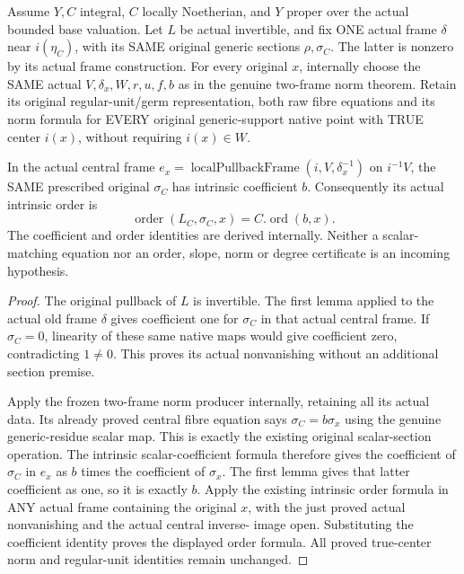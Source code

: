\begin{theorem}
\label{thm:intrinsic-numerical-central-section-original-order-and-norm}
\leanok
{}
Assume $Y,C$ integral, $C$ locally Noetherian, and $Y$ proper over the
actual bounded base valuation. Let $L$ be actual invertible, and fix ONE
actual frame $\delta$ near $i(\eta_C)$, with its SAME original generic
sections $\rho,\sigma_C$. The latter is nonzero by its actual frame
construction. For every original $x$, internally choose the SAME actual
$V,\delta_x,W,r,u,f,b$ as in the genuine two-frame norm theorem. Retain
its original regular-unit/germ representation, both raw fibre equations
and its norm formula for EVERY original generic-support native point with
TRUE center $i(x)$, without requiring $i(x)\in W$.

In the actual central frame
$e_x=\operatorname{localPullbackFrame}(i,V,\delta_x^{-1})$ on $i^{-1}V$,
the SAME prescribed original $\sigma_C$ has intrinsic coefficient $b$.
Consequently its actual intrinsic order is
\[
 \operatorname{order}(L_C,\sigma_C,x)=C.\operatorname{ord}(b,x).
\]
The coefficient and order identities are derived internally. Neither a
scalar-matching equation nor an order, slope, norm or degree certificate
is an incoming hypothesis.
\end{theorem}
\begin{proof}
The original pullback of $L$ is invertible. The first lemma applied to
the actual old frame $\delta$ gives coefficient one for $\sigma_C$ in
that actual central frame. If $\sigma_C=0$, linearity of these same native
maps would give coefficient zero, contradicting $1\ne0$. This proves its
actual nonvanishing without an additional section premise.

Apply the frozen two-frame norm producer internally, retaining all its
actual data. Its already proved central fibre equation says
$\sigma_C=b\sigma_x$ using the genuine generic-residue scalar map. This
is exactly the existing original scalar-section operation. The intrinsic
scalar-coefficient formula therefore gives the coefficient of $\sigma_C$
in $e_x$ as $b$ times the coefficient of $\sigma_x$. The first lemma gives
that latter coefficient as one, so it is exactly $b$. Apply the existing
intrinsic order formula in ANY actual frame containing the original $x$,
with the just proved actual nonvanishing and the actual central inverse-
image open. Substituting the coefficient identity proves the displayed
order formula. All proved true-center norm and regular-unit
identities remain unchanged.
\end{proof}


